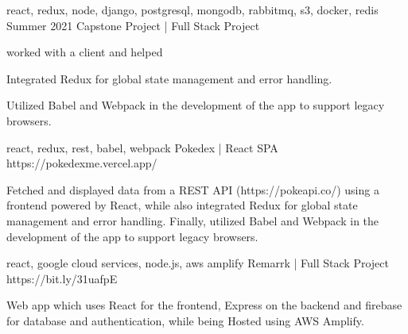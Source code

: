


\begin{cventries}



\vspace{-1.0mm}
  \cventry
    {react, redux, node, django, postgresql, mongodb, rabbitmq, s3, docker, redis } %
    {Summer 2021 Capstone Project | Full Stack Project}  %
    {} %
    {} 
    {
      \begin{cvitems} %
        \item {worked with a client and helped }
        \item {Integrated Redux for global state management and error handling.}
        \item {Utilized Babel and Webpack in the development of the app to support legacy browsers. }
      \end{cvitems}
    }

\vspace{-1.0mm}
  \cventry
    {react, redux, rest, babel, webpack} %
    {Pokedex | React SPA}  %
    {https://pokedexme.vercel.app/} %
    {} 
    {
      \begin{cvitems} %
        \item {Fetched and displayed data from a REST API (https://pokeapi.co/) using a frontend powered by React, while also integrated Redux for global state management and error handling. Finally, utilized Babel and Webpack in the development of the app to support legacy browsers.} 
      \end{cvitems}
    }

\vspace{-1.0mm}
  \cventry
    {react, google cloud services, node.js, aws amplify} %
    {Remarrk | Full Stack Project}  %
    {https://bit.ly/31uafpE} %
    {} 
    {
      \begin{cvitems} %
        \item {Web app which uses React for the frontend, Express on the backend and firebase for database and authentication, while being Hosted using AWS Amplify.} 
      \end{cvitems}
    }


\end{cventries}
